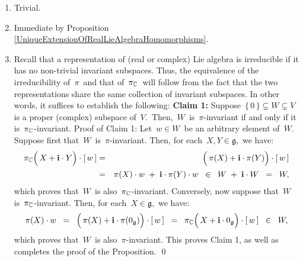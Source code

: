 \begin{enumerate}
\item
	Trivial.
\item
	Immediate by Proposition \ref{UniqueExtensionOfRealLieAlgebraHomomorphisms}.
\item
	Recall that a representation of (real or complex) Lie algebra is irreducible if it has
	no non-trivial invariant subspaces.
	Thus, the equivalence of the irreducibility of \,$\pi$\, and that of \,$\pi_{\mathbb{C}}$\,
	will follow from the fact that the two representations share the same collection
	of invariant subspaces. In other words, it suffices to establish the following:
	\vskip 0.2cm
	\noindent
	\textbf{Claim 1:}\quad
	Suppose \,$\{\,0\,\} \subsetneq W \subsetneq V$\, is a proper (complex) subspace of \,$V$.\,
	Then, \,$W$\, is \,$\pi$-invariant if and only if it is \,$\pi_{\mathbb{C}}$-invariant. 
	\vskip 0.1cm
	\noindent
	Proof of Claim 1:\quad
	Let \,$w \in W$\, be an arbitrary element of \,$W$.\,
	Suppose first that \,$W$\, is \,$\pi$-invariant.
	Then, for each \,$X, Y \in \mathfrak{g}$,\, we have:
	\begin{eqnarray*}
	\pi_{\C}\!\left(\,X \overset{{\color{white}.}}{+} \i\cdot Y \right) \cdot [\,w\,]
	& = &
		\left(\,\pi(X) \overset{{\color{white}.}}{+} \i\cdot \pi(Y) \right) \cdot [\,w\,]
	\\
	& = &
		\pi(X) \cdot w \;\overset{{\color{white}.}}{+}\; \i\cdot \pi(Y) \cdot w
	\;\; \in \;\;
		W \; + \; \i \cdot W
	\;\; = \;\;
		W,
	\end{eqnarray*}
	which proves that \,$W$\, is also \,$\pi_{\mathbb{C}}$-invariant.
	Conversely, now suppose that \,$W$\, is \,$\pi_{\mathbb{C}}$-invariant.
	Then, for each \,$X \in \mathfrak{g}$,\, we have:
	\begin{equation*}
	\pi(X)\cdot w
	\;\; = \;\;
		\left(\,\pi(X) \overset{{\color{white}.}}{+} \i\cdot \pi(0_{\mathfrak{g}}) \right) \cdot [\,w\,]
	\;\; = \;\;
		\pi_{\C}\!\left(\,X \overset{{\color{white}.}}{+} \i\cdot 0_{\mathfrak{g}} \right) \cdot [\,w\,]
	\;\; \in \;\;
		W,
	\end{equation*}
	which proves that \,$W$\, is also \,$\pi$-invariant.
	This proves Claim 1, as well as completes the proof of the Proposition.
	\qed
\end{enumerate}

